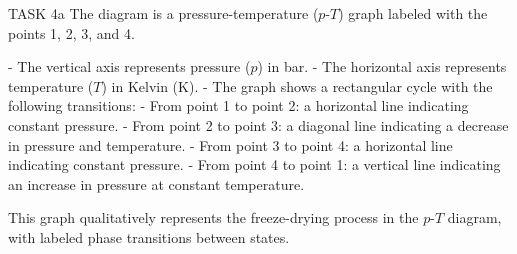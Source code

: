 TASK 4a  
The diagram is a pressure-temperature (\( p \)-\( T \)) graph labeled with the points 1, 2, 3, and 4.  

- The vertical axis represents pressure (\( p \)) in bar.  
- The horizontal axis represents temperature (\( T \)) in Kelvin (\( \text{K} \)).  
- The graph shows a rectangular cycle with the following transitions:  
  - From point 1 to point 2: a horizontal line indicating constant pressure.  
  - From point 2 to point 3: a diagonal line indicating a decrease in pressure and temperature.  
  - From point 3 to point 4: a horizontal line indicating constant pressure.  
  - From point 4 to point 1: a vertical line indicating an increase in pressure at constant temperature.  

This graph qualitatively represents the freeze-drying process in the \( p \)-\( T \) diagram, with labeled phase transitions between states.